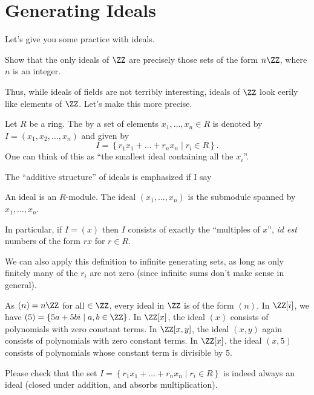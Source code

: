 \section{Generating Ideals}
Let's give you some practice with ideals.

\begin{exercise}
	Show that the only ideals of $\ZZ$ are precisely those
	sets of the form $n\ZZ$, where $n$ is an integer.
\end{exercise}

Thus, while ideals of fields are not terribly interesting,
ideals of $\ZZ$ look eerily like elements of $\ZZ$.
Let's make this more precise.
\begin{definition}
	Let $R$ be a ring.
	The  by a set of elements $x_1, \dots, x_n \in R$
	is denoted by $I = (x_1, x_2, \dots, x_n)$
	and given by
	\[
		I = \left\{ r_1x_1 + \dots + r_nx_n \mid r_i \in R \right\}.
	\]
	One can think of this as ``the smallest ideal containing all the $x_i$''.
\end{definition}
The ``additive structure'' of ideals is emphasized if I say
\begin{moral}
	An ideal is an $R$-module.
	The ideal $(x_1, \dots, x_n)$ is the submodule
	spanned by $x_1, \dots, x_n$.
\end{moral}
In particular, if $I = (x)$ then $I$ consists of exactly the
``multiples of $x$'', \emph{id est}
numbers of the form $rx$ for $r \in R$.
\begin{remark}
	We can also apply this definition to infinite generating sets, as long as
	only finitely many of the $r_i$ are not zero (since infinite sums
	don't make sense in general).
\end{remark}

\begin{example}
	\listhack
	\begin{enumerate}[(a)]
		\ii As $(n) = n\ZZ$ for all $ \in \ZZ$,
		every ideal in $\ZZ$ is of the form $(n)$.
		\ii In $\ZZ[i]$, we have
		$(5) = \left\{ 5a + 5b i \mid a,b \in \ZZ \right\}$.
		\ii In $\ZZ[x]$, the ideal $(x)$ consists of polynomials
		with zero constant terms.
		\ii In $\ZZ[x,y]$, the ideal $(x,y)$ again consists
		of polynomials with zero constant terms.
		\ii In $\ZZ[x]$, the ideal $(x,5)$ consists of polynomials
		whose constant term is divisible by $5$.
	\end{enumerate}
\end{example}
\begin{ques}
	Please check that the set 
	$I = \left\{ r_1x_1 + \dots + r_nx_n \mid r_i \in R \right\}$
	is indeed always an ideal (closed under addition,
	and absorbs multiplication).
\end{ques}


